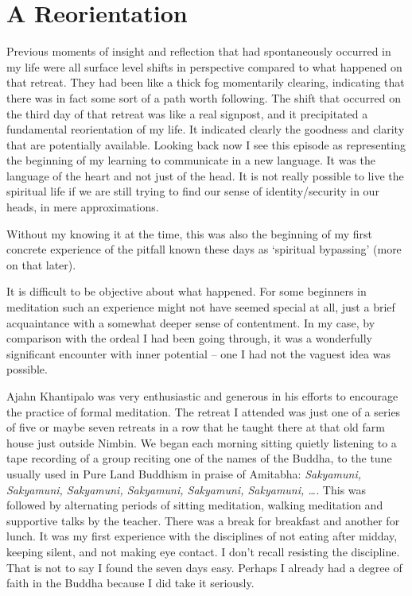 \chapter{A Reorientation}

Previous moments of insight and reflection that had spontaneously
occurred in my life were all surface level shifts in perspective
compared to what happened on that retreat. They had been like a thick
fog momentarily clearing, indicating that there was in fact some sort of
a path worth following. The shift that occurred on the third day of that
retreat was like a real signpost, and it precipitated a fundamental
reorientation of my life. It indicated clearly the goodness and clarity
that are potentially available. Looking back now I see this episode as
representing the beginning of my learning to communicate in a new
language. It was the language of the heart and not just of the head. It
is not really possible to live the spiritual life if we are still trying
to find our sense of identity/security in our heads, in mere
approximations.

Without my knowing it at the time, this was also the beginning of my
first concrete experience of the pitfall known these days as `spiritual
bypassing' (more on that later).

It is difficult to be objective about what happened. For some beginners
in meditation such an experience might not have seemed special at all,
just a brief acquaintance with a somewhat deeper sense of contentment.
In my case, by comparison with the ordeal I had been going through, it
was a wonderfully significant encounter with inner potential -- one I
had not the vaguest idea was possible.

Ajahn Khantipalo was very enthusiastic and generous in his efforts to
encourage the practice of formal meditation. The retreat I attended was
just one of a series of five or maybe seven retreats in a row that he
taught there at that old farm house just outside Nimbin. We began each
morning sitting quietly listening to a tape recording of a group
reciting one of the names of the Buddha, to the tune usually used in
Pure Land Buddhism in praise of Amitabha: \emph{Sakyamuni, Sakyamuni,
Sakyamuni, Sakyamuni, Sakyamuni, Sakyamuni, \ldots.} This was followed
by alternating periods of sitting meditation, walking meditation and
supportive talks by the teacher. There was a break for breakfast and
another for lunch. It was my first experience with the disciplines of
not eating after midday, keeping silent, and not making eye contact. I
don't recall resisting the discipline. That is not to say I found the
seven days easy. Perhaps I already had a degree of faith in the Buddha
because I did take it seriously.

